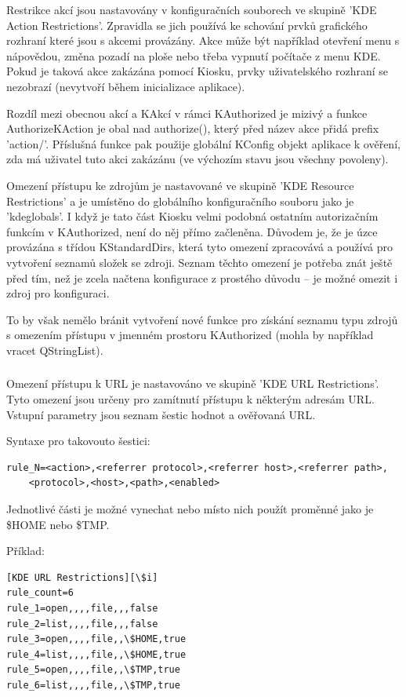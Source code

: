 Restrikce akcí jsou nastavovány v konfiguračních souborech ve skupině
'KDE Action Restrictions'. Zpravidla se jich používá ke schování prvků
grafického rozhraní které jsou s akcemi provázány. Akce může být
například otevření menu s nápovědou, změna pozadí na ploše nebo třeba vypnutí
počítače z menu KDE. Pokud je taková akce zakázána pomocí Kiosku, prvky
uživatelského rozhraní se nezobrazí (nevytvoří během inicializace aplikace).

Rozdíl mezi obecnou akcí a KAkcí v rámci KAuthorized je mizivý a funkce
AuthorizeKAction je obal nad authorize(), který před název akce přidá prefix
'action/'. Příslušná funkce pak použije globální KConfig objekt aplikace
k ověření, zda má uživatel tuto akci zakázánu (ve výchozím stavu jsou všechny
povoleny).

Omezení přístupu ke zdrojům je nastavované ve skupině
'KDE Resource Restrictions' a je umístěno do globálního konfiguračního souboru
jako je 'kdeglobals'. I když je tato část Kiosku velmi podobná ostatním
autorizačním funkcím v KAuthorized, není do něj přímo začleněna. Důvodem je, že
je úzce provázána s třídou KStandardDirs, která tyto omezení zpracovává
a používá pro vytvoření seznamů složek se zdroji. Seznam těchto omezení je
potřeba znát ještě před tím, než je zcela načtena konfigurace z prostého důvodu
-- je možné omezit i zdroj pro konfiguraci.

To by však nemělo bránit vytvoření nové funkce pro získání seznamu typu zdrojů
s omezením přístupu v jmenném prostoru KAuthorized (mohla by například vracet
QStringList).

\subsubsection{}
Omezení přístupu k URL je nastavováno ve skupině 'KDE URL Restrictions'. Tyto
omezení jsou určeny pro zamítnutí přístupu k některým adresám URL. Vstupní
parametry jsou seznam šestic hodnot a ověřovaná URL.

Syntaxe pro takovouto šestici:
\begin{verbatim}
rule_N=<action>,<referrer protocol>,<referrer host>,<referrer path>,
    <protocol>,<host>,<path>,<enabled>
\end{verbatim}

Jednotlivé části je možné vynechat nebo místo nich použít proměnné jako
je \$HOME nebo \$TMP.

Příklad:
\begin{verbatim}
[KDE URL Restrictions][\$i]
rule_count=6
rule_1=open,,,,file,,,false
rule_2=list,,,,file,,,false
rule_3=open,,,,file,,\$HOME,true
rule_4=list,,,,file,,\$HOME,true
rule_5=open,,,,file,,\$TMP,true
rule_6=list,,,,file,,\$TMP,true
\end{verbatim}

